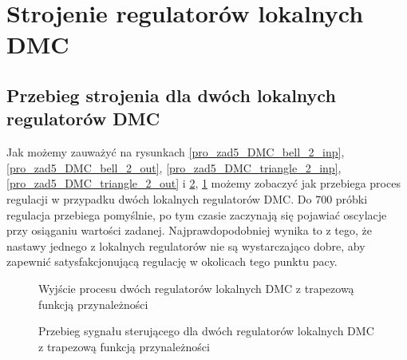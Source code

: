 \section{Strojenie regulatorów lokalnych DMC}

\subsection{Przebieg strojenia dla dwóch lokalnych regulatorów DMC}
Jak możemy zauważyć na rysunkach \ref{pro_zad5_DMC_bell_2_inp}, \ref{pro_zad5_DMC_bell_2_out}, \ref{pro_zad5_DMC_triangle_2_inp}, \ref{pro_zad5_DMC_triangle_2_out} i \ref{pro_zad5_DMC_trapezoid_2_inp}, \ref{pro_zad5_DMC_trapezoid_2_out} możemy zobaczyć jak przebiega proces regulacji w przypadku dwóch lokalnych regulatorów DMC. Do 700 próbki regulacja przebiega pomyślnie, po tym czasie zaczynają się pojawiać oscylacje przy osiąganiu wartości zadanej. Najprawdopodobniej wynika to z tego, że nastawy jednego z lokalnych regulatorów nie są wystarczająco dobre, aby zapewnić satysfakcjonującą regulację w okolicach tego punktu pacy. 
\begin{figure}[t]
    \centering
    \caption{Wyjście procesu dwóch regulatorów lokalnych DMC z trapezową funkcją przynależności}
    \label{pro_zad5_DMC_trapezoid_2_out}
\end{figure}

\begin{figure}[b]
    \centering
    \caption{Przebieg sygnału sterującego dla dwóch regulatorów lokalnych DMC z trapezową funkcją przynależności}
    \label{pro_zad5_DMC_trapezoid_2_inp}
\end{figure}


